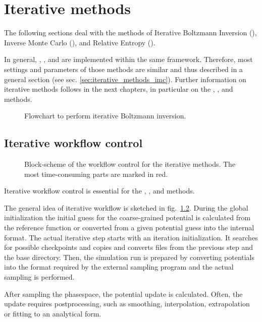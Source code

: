 \chapter{Iterative methods}
\label{sec:iterative_methods}

The following sections deal with the methods of Iterative Boltzmann Inversion
(\ibi), Inverse Monte Carlo (\imc), and Relative Entropy (\re).

In general, \ibi, \imc, and \re are implemented within the same
framework. Therefore, most settings and parameters of those methods are similar
and thus described in a general section (see
sec. \ref{sec:iterative_methods_imc}). Further information on iterative methods
follows in the next chapters, in particular on the \ibi, \imc, and \re methods.

\begin{figure}[h]
   \centering
   \caption{\label{fig:flow_ibi}Flowchart to perform iterative Boltzmann inversion.}
\end{figure}

\section{Iterative workflow control}
\label{sec:iterative_workflow}

\begin{figure}[t]
   \centering
   \caption{\label{fig:flowchart}Block-scheme of the workflow control for the iterative methods. The most time-consuming parts are marked in red.}
\end{figure}

Iterative workflow control is essential for the \ibi, \imc, and \re methods.

The general idea of iterative workflow is sketched in fig.~\ref{fig:flowchart}. During the global initialization the initial guess for the coarse-grained potential is calculated from the reference function or converted from a given potential guess into the internal format. The actual iterative step starts with an iteration initialization. It searches for possible checkpoints and copies and converts files from the previous step and the base directory. Then, the simulation run is prepared by converting potentials into the format required by the external sampling program and the actual sampling is performed.

After sampling the phasespace, the potential update is calculated. Often, the update requires postprocessing, such as smoothing, interpolation, extrapolation or fitting to an analytical form.

